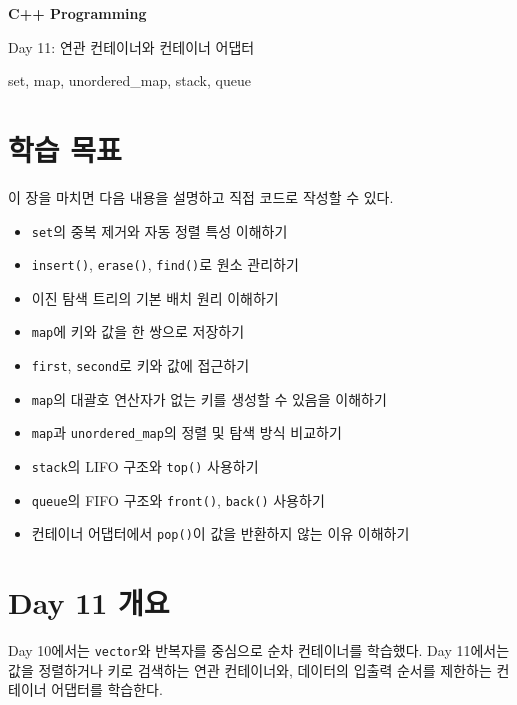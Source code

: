 \documentclass[11pt,a4paper]{article}
\begin{document}
\begin{titlepage}
    \centering
    \vspace*{3cm}
    {\Huge\bfseries C++ Programming\par}
    \vspace{0.8cm}
    {\LARGE Day 11: 연관 컨테이너와 컨테이너 어댑터\par}
    \vspace{2cm}
    {\large set, map, unordered\_map, stack, queue\par}
    \vfill
\end{titlepage}

\tableofcontents
\newpage

\section{학습 목표}
\begin{learningbox}
이 장을 마치면 다음 내용을 설명하고 직접 코드로 작성할 수 있다.
\begin{itemize}[leftmargin=1.5em]
    \item \texttt{set}의 중복 제거와 자동 정렬 특성 이해하기
    \item \texttt{insert()}, \texttt{erase()}, \texttt{find()}로 원소 관리하기
    \item 이진 탐색 트리의 기본 배치 원리 이해하기
    \item \texttt{map}에 키와 값을 한 쌍으로 저장하기
    \item \texttt{first}, \texttt{second}로 키와 값에 접근하기
    \item \texttt{map}의 대괄호 연산자가 없는 키를 생성할 수 있음을 이해하기
    \item \texttt{map}과 \texttt{unordered\_map}의 정렬 및 탐색 방식 비교하기
    \item \texttt{stack}의 LIFO 구조와 \texttt{top()} 사용하기
    \item \texttt{queue}의 FIFO 구조와 \texttt{front()}, \texttt{back()} 사용하기
    \item 컨테이너 어댑터에서 \texttt{pop()}이 값을 반환하지 않는 이유 이해하기
\end{itemize}
\end{learningbox}

\section{Day 11 개요}
Day 10에서는 \texttt{vector}와 반복자를 중심으로 순차 컨테이너를 학습했다. Day 11에서는 값을 정렬하거나 키로 검색하는 연관 컨테이너와, 데이터의 입출력 순서를 제한하는 컨테이너 어댑터를 학습한다.
\end{document}
